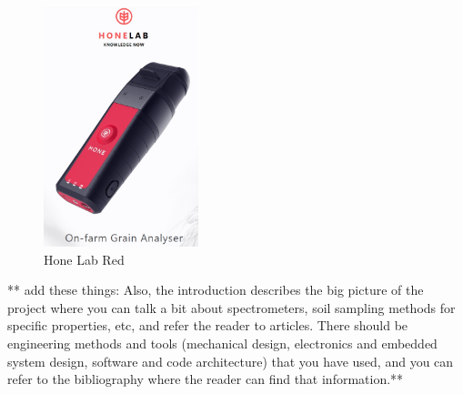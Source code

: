 \documentclass{UoNMCHA}
\numberwithin{equation}{section}
\begin{document}
\begin{figure}[h]
	\centering
	\includegraphics[width=0.4\textwidth]{HONE_AD.jpg}
	\caption{Hone Lab Red}
	\label{fig:HLR}
\end{figure}

** add these things:
 Also, the introduction describes the big picture of the project where you can talk a bit about spectrometers, soil sampling methods for specific properties, etc, and refer the reader to articles. There should be engineering methods and tools (mechanical design, electronics and embedded system design, software and code architecture) that you have used, and you can refer to the bibliography where the reader can find that information.**\\
\newpage
\end{document}
